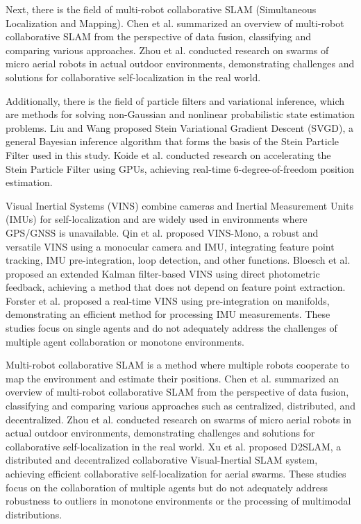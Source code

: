 \documentclass[a4paper,fleqn,10pt,twocolumn]{SICE_ISCS}
\begin{document}
Next, there is the field of multi-robot collaborative SLAM (Simultaneous Localization and Mapping). Chen et al. \cite{Chen2021} summarized an overview of multi-robot collaborative SLAM from the perspective of data fusion, classifying and comparing various approaches. Zhou et al. \cite{Zhou2018} conducted research on swarms of micro aerial robots in actual outdoor environments, demonstrating challenges and solutions for collaborative self-localization in the real world.

Additionally, there is the field of particle filters and variational inference, which are methods for solving non-Gaussian and nonlinear probabilistic state estimation problems. Liu and Wang \cite{Liu2016} proposed Stein Variational Gradient Descent (SVGD), a general Bayesian inference algorithm that forms the basis of the Stein Particle Filter used in this study. Koide et al. \cite{Koide2021} conducted research on accelerating the Stein Particle Filter using GPUs, achieving real-time 6-degree-of-freedom position estimation.

Visual Inertial Systems (VINS) combine cameras and Inertial Measurement Units (IMUs) for self-localization and are widely used in environments where GPS/GNSS is unavailable. Qin et al. \cite{Qin2018} proposed VINS-Mono, a robust and versatile VINS using a monocular camera and IMU, integrating feature point tracking, IMU pre-integration, loop detection, and other functions. Bloesch et al. \cite{Bloesch2017} proposed an extended Kalman filter-based VINS using direct photometric feedback, achieving a method that does not depend on feature point extraction. Forster et al. \cite{Forster2017} proposed a real-time VINS using pre-integration on manifolds, demonstrating an efficient method for processing IMU measurements. These studies focus on single agents and do not adequately address the challenges of multiple agent collaboration or monotone environments.

Multi-robot collaborative SLAM is a method where multiple robots cooperate to map the environment and estimate their positions. Chen et al. \cite{Chen2021} summarized an overview of multi-robot collaborative SLAM from the perspective of data fusion, classifying and comparing various approaches such as centralized, distributed, and decentralized. Zhou et al. \cite{Zhou2018} conducted research on swarms of micro aerial robots in actual outdoor environments, demonstrating challenges and solutions for collaborative self-localization in the real world. Xu et al. \cite{Xu2020} proposed D2SLAM, a distributed and decentralized collaborative Visual-Inertial SLAM system, achieving efficient collaborative self-localization for aerial swarms. These studies focus on the collaboration of multiple agents but do not adequately address robustness to outliers in monotone environments or the processing of multimodal distributions.
\end{document}
